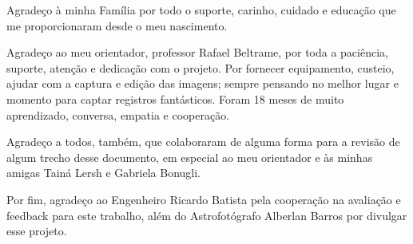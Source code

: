 Agradeço à minha Família por todo o suporte, carinho, cuidado e educação que me proporcionaram desde o meu nascimento. 

Agradeço ao meu orientador, professor Rafael Beltrame, por toda a paciência, suporte, atenção e dedicação com o projeto. Por fornecer equipamento, custeio, ajudar com a captura e edição das imagens; sempre pensando no melhor lugar e momento para captar registros fantásticos. Foram 18 meses de muito aprendizado, conversa, empatia e cooperação.

Agradeço a todos, também, que colaboraram de alguma forma para a revisão de algum trecho desse documento, em especial ao meu orientador e às minhas amigas Tainá Lersh e Gabriela Bonugli. 

Por fim, agradeço ao Engenheiro Ricardo Batista pela cooperação na avaliação e feedback para este trabalho, além do Astrofotógrafo Alberlan Barros por divulgar esse projeto. 
